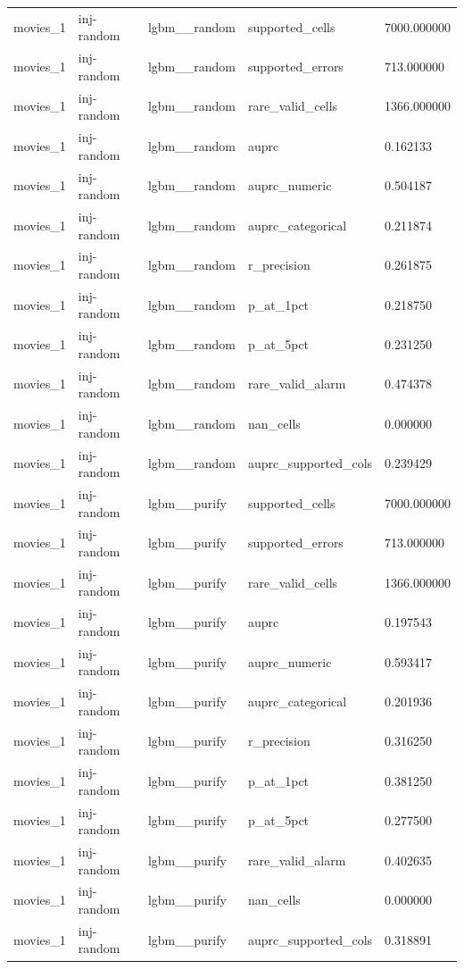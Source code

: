 \begin{tabular}{lllll}
movies\_1 & inj-random & lgbm\_\_random & supported\_cells & 7000.000000 \\
movies\_1 & inj-random & lgbm\_\_random & supported\_errors & 713.000000 \\
movies\_1 & inj-random & lgbm\_\_random & rare\_valid\_cells & 1366.000000 \\
movies\_1 & inj-random & lgbm\_\_random & auprc & 0.162133 \\
movies\_1 & inj-random & lgbm\_\_random & auprc\_numeric & 0.504187 \\
movies\_1 & inj-random & lgbm\_\_random & auprc\_categorical & 0.211874 \\
movies\_1 & inj-random & lgbm\_\_random & r\_precision & 0.261875 \\
movies\_1 & inj-random & lgbm\_\_random & p\_at\_1pct & 0.218750 \\
movies\_1 & inj-random & lgbm\_\_random & p\_at\_5pct & 0.231250 \\
movies\_1 & inj-random & lgbm\_\_random & rare\_valid\_alarm & 0.474378 \\
movies\_1 & inj-random & lgbm\_\_random & nan\_cells & 0.000000 \\
movies\_1 & inj-random & lgbm\_\_random & auprc\_supported\_cols & 0.239429 \\
movies\_1 & inj-random & lgbm\_\_purify & supported\_cells & 7000.000000 \\
movies\_1 & inj-random & lgbm\_\_purify & supported\_errors & 713.000000 \\
movies\_1 & inj-random & lgbm\_\_purify & rare\_valid\_cells & 1366.000000 \\
movies\_1 & inj-random & lgbm\_\_purify & auprc & 0.197543 \\
movies\_1 & inj-random & lgbm\_\_purify & auprc\_numeric & 0.593417 \\
movies\_1 & inj-random & lgbm\_\_purify & auprc\_categorical & 0.201936 \\
movies\_1 & inj-random & lgbm\_\_purify & r\_precision & 0.316250 \\
movies\_1 & inj-random & lgbm\_\_purify & p\_at\_1pct & 0.381250 \\
movies\_1 & inj-random & lgbm\_\_purify & p\_at\_5pct & 0.277500 \\
movies\_1 & inj-random & lgbm\_\_purify & rare\_valid\_alarm & 0.402635 \\
movies\_1 & inj-random & lgbm\_\_purify & nan\_cells & 0.000000 \\
movies\_1 & inj-random & lgbm\_\_purify & auprc\_supported\_cols & 0.318891 \\

\end{tabular}
